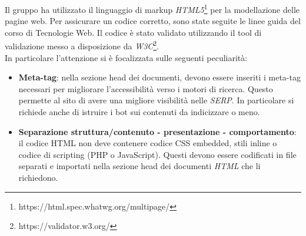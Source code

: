 Il gruppo ha utilizzato il linguaggio di markup \textit{HTML5}\footnote{https://html.spec.whatwg.org/multipage/} per la modellazione delle pagine web.
Per assicurare un codice corretto, sono state seguite le linee guida del corso di Tecnologie Web. Il codice è stato validato utilizzando il tool di validazione messo a disposizione da \textit{W3C}\footnote{https://validator.w3.org/}.\\
In particolare l'attenzione si è focalizzata sulle seguenti peculiarità:
\begin{itemize}
    \item \textbf{Meta-tag}: nella sezione head dei documenti, devono essere inseriti i meta-tag necessari per migliorare l'accessibilità verso i motori di ricerca. Questo permette al sito di avere una migliore visibilità nelle \textit{SERP}. In particolare si richiede anche di istruire i bot sui contenuti da indicizzare o meno.
    \item \textbf{Separazione struttura/contenuto - presentazione - comportamento}: il codice HTML non deve contenere codice CSS embedded, stili inline o codice di scripting (PHP o JavaScript). Questi devono essere codificati in file separati e importati nella sezione head dei documenti \textit{HTML} che li richiedono.
\end{itemize}

